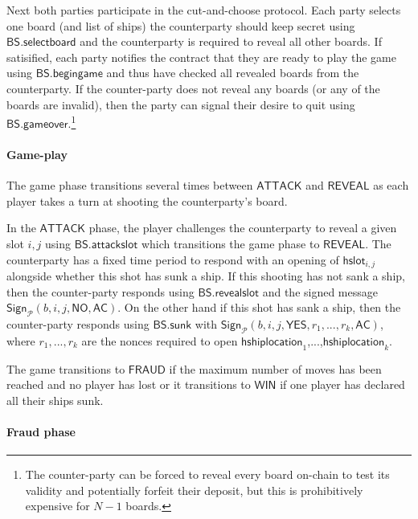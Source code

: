 \documentclass{llncs}
\newcommand{\instantiatedno}{\mathsf{NO}}
\newcommand{\instantiatedyes}{\mathsf{YES}}
\newcommand{\gameattack}{\mathsf{ATTACK}}
\newcommand{\gamereveal}{\mathsf{REVEAL}}
\newcommand{\gamewinner}{\mathsf{WIN}}
\newcommand{\gamefraud}{\mathsf{FRAUD}}
\newcommand{\hslot}{\mathsf{hslot}}
\newcommand{\hshiplocation}{\mathsf{hshiplocation}}
\newcommand{\participant}{\mathcal{P}}
\newcommand{\sign}{\mathsf{Sign}}
\newcommand{\battleshipfraud}{\mathsf{BS.fraud}}
\newcommand{\battleshipattackslot}{\mathsf{BS.attackslot}}
\newcommand{\battleshipbegin}{\mathsf{BS.begingame}}
\newcommand{\battleshipselectboard}{\mathsf{BS.selectboard}}
\newcommand{\battleshiprevealslot}{\mathsf{BS.revealslot}}
\newcommand{\battleshipsinking}{\mathsf{BS.sunk}}
\newcommand{\battleshipgameover}{\mathsf{BS.gameover}}
\newcommand{\appcontract}{\mathsf{AC}}
\begin{document}
Next both parties participate in the cut-and-choose protocol.
Each party selects one board (and list of ships) the counterparty should keep secret using $\battleshipselectboard$ and the counterparty is required to reveal all other boards. 
If satisified, each party notifies the contract that they are ready to play the game using $\battleshipbegin$ and thus have checked all revealed boards from the counterparty. 
If the counter-party does not reveal any boards (or any of the boards are invalid), then the party can signal their desire to quit  using $\battleshipgameover$.\footnote{The counter-party can be forced to reveal every board on-chain to test its validity and potentially forfeit their deposit, but this is prohibitively expensive for $N-1$ boards.}

\paragraph{Game-play} The game phase transitions several times between $\gameattack$ and $\gamereveal$ as each player takes a turn at shooting the counterparty's board. 

In the $\gameattack$ phase, the player challenges the counterparty to reveal a given slot $i,j$ using $\battleshipattackslot$ which transitions the game phase to $\gamereveal$. 
The counterparty has a fixed time period to respond with an opening of $\hslot_{i,j}$ alongside whether this shot has sunk a ship.
If this shooting has not sank a ship, then the counter-party responds using $\battleshiprevealslot$ and the signed message $\sign_{\participant}(b, i, j, \instantiatedno, \appcontract)$.
On the other hand if this shot has sank a ship, then the counter-party responds using $\battleshipsinking$ with
$\sign_{\participant}(b, i, j, \instantiatedyes, r_{1},...,r_{k}, \appcontract)$, where $r_{1},...,r_{k}$ are the nonces required to open $\hshiplocation_{1}$,...,$\hshiplocation_{k}$. 

The game transitions to $\gamefraud$ if the maximum number of moves has been reached and no player has lost or it transitions to $\gamewinner$ if one player has declared all their ships sunk. 

\paragraph{Fraud phase} 
\end{document}
